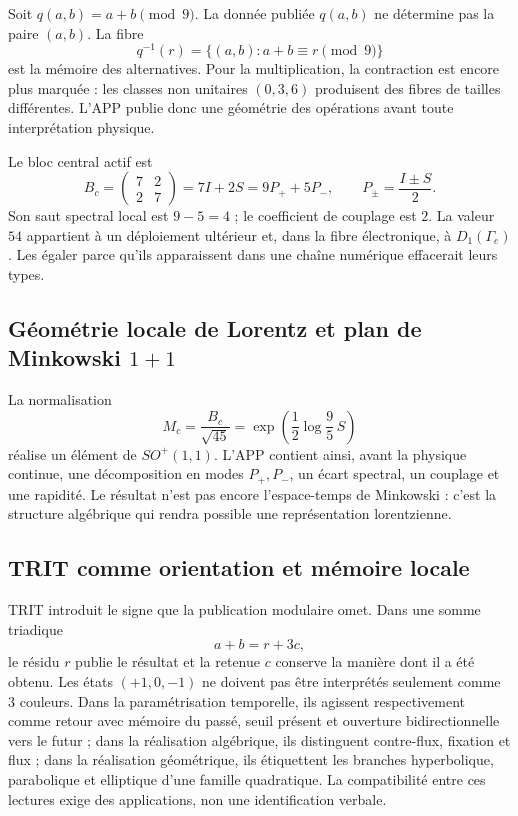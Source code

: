 Soit \(q(a,b)=a+b\pmod 9\). La donnée publiée \(q(a,b)\) ne détermine pas la paire
\((a,b)\). La fibre
\[
 q^{-1}(r)=\{(a,b):a+b\equiv r\pmod9\}
\]
est la mémoire des alternatives. Pour la multiplication, la contraction est encore
plus marquée : les classes non unitaires \((0,3,6)\) produisent des fibres de tailles
différentes. L’APP publie donc une géométrie des opérations avant
toute interprétation physique.

Le bloc central actif est
\[
B_c=\begin{pmatrix}7&2\\2&7\end{pmatrix}
   =7I+2S=9P_++5P_-,
\qquad
P_\pm=\frac{I\pm S}{2}.
\]
Son saut spectral local est \(9-5=4\) ; le coefficient de couplage est \(2\).
La valeur \(54\) appartient à un déploiement ultérieur et, dans la fibre électronique,
à \(D_1(\Gamma_e)\). Les égaler parce qu’ils apparaissent dans une chaîne numérique effacerait
leurs types.

\subsection{Géométrie locale de Lorentz et plan de Minkowski \texorpdfstring{\(1+1\)}{1+1}}

La normalisation
\[
M_c=\frac{B_c}{\sqrt{45}}
=\exp\!\left(\frac12\log\frac95\,S\right)
\]
réalise un élément de \(SO^+(1,1)\). L’APP contient ainsi, avant la physique
continue, une décomposition en modes \(P_+,P_-\), un écart spectral, un couplage
et une rapidité. Le résultat n’est pas encore l’espace-temps de Minkowski : c’est
la structure algébrique qui rendra possible une représentation lorentzienne.

\subsection{TRIT comme orientation et mémoire locale}

TRIT introduit le signe que la publication modulaire omet. Dans une somme triadique
\[
 a+b=r+3c,
\]
le résidu \(r\) publie le résultat et la retenue \(c\) conserve la manière dont il a été
obtenu. Les états \((+1,0,-1)\) ne doivent pas être interprétés seulement comme \(3\)
couleurs. Dans la paramétrisation temporelle, ils agissent respectivement comme
retour avec mémoire du passé, seuil présent et ouverture bidirectionnelle vers le futur ;
dans la réalisation algébrique, ils distinguent contre-flux, fixation et flux ; dans la
réalisation géométrique, ils étiquettent les branches hyperbolique, parabolique et elliptique
d’une famille quadratique. La compatibilité entre ces lectures exige des applications,
non une identification verbale.

